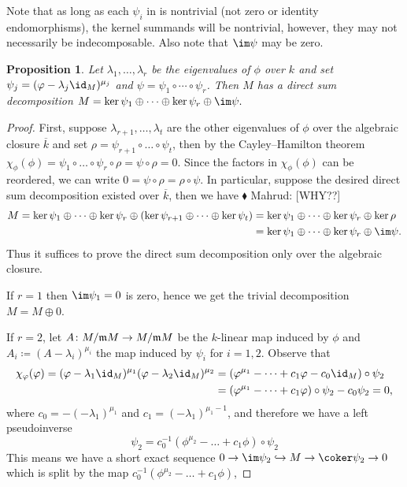 \documentclass[12pt]{article}
\let\bar\overline
\theoremstyle{theorem}
\numberwithin{thm}{section}
\newtheorem{prop}[thm]{Proposition}
\theoremstyle{definition}
\newcommand{\mahrud}[1]{{\color{ForestGreen} \sf $\blacklozenge$ Mahrud: [#1]}}
\begin{document}
Note that as long as each $\psi_i$ in  is nontrivial (not zero or identity endomorphisms), the kernel summands will be nontrivial, however, they may not necessarily be indecomposable. Also note that $\im\psi$ may be zero.

\pagebreak
\begin{prop}\label{prop:split-surj}
  Let $\lambda_1,\dots,\lambda_r$ be the eigenvalues of $\phi$ over $k$ and set $\psi_j = (\phi - \lambda_j\id_M)^{\mu_j}$ and $\psi = \psi_1\circ\cdots\circ\psi_r$. Then $M$ has a direct sum decomposition
  \( M = \ker\psi_1 \oplus \cdots \oplus \ker\psi_r \oplus \im\psi. \)
\end{prop}
\begin{proof}
  First, suppose $\lambda_{r+1},\dots,\lambda_t$ are the other eigenvalues of $\phi$ over the algebraic closure $\bar k$ and set $\rho = \psi_{r+1}\circ\dots\circ\psi_t$, then by the Cayley--Hamilton theorem $\chi_\phi(\phi) = \psi_1\circ\dots\circ\psi_r\circ\rho = \psi\circ\rho = 0$. Since the factors in $\chi_\phi(\phi)$ can be reordered, we can write $0 = \psi\circ\rho = \rho \circ \psi$. In particular, suppose the desired direct sum decomposition existed over $\bar k$, then we have \mahrud{WHY??}
  \begin{align*}
    M = \ker\psi_1\oplus\dots\oplus\ker\psi_r\oplus(\ker\psi_{r+1}\oplus\dots\oplus\ker\psi_t)
    &= \ker\psi_1\oplus\dots\oplus\ker\psi_r\oplus\ker\rho \\
    &= \ker\psi_1\oplus\dots\oplus\ker\psi_r\oplus\im\psi.
  \end{align*}
  Thus it suffices to prove the direct sum decomposition only over the algebraic closure.
  
  If $r = 1$ then $\im\psi_1=0$ is zero, hence we get the trivial decomposition $M = M \oplus 0$.

  If $r = 2$, let $A\colon M/\mathfrak m M\to M/\mathfrak m M$ be the $k$-linear map induced by $\phi$ and $A_i\coloneqq(A - \lambda_i)^{\mu_i}$ the map induced by $\psi_i$ for $i=1,2$. Observe that
  \begin{align*}
  \chi_\phi(\phi) = (\phi - \lambda_1\id_M)^{\mu_1} (\phi - \lambda_2\id_M)^{\mu_2}
  &= \left(\phi^{\mu_1} - \dots + c_1\phi - c_0\id_M\right)\circ\psi_2 \\
  &= \left(\phi^{\mu_1} - \dots + c_1\phi\right)\circ\psi_2 - c_0\psi_2 = 0,
  \end{align*}
  where $c_0 = -(-\lambda_1)^{\mu_1}$ and $c_1 = (-\lambda_1)^{\mu_1-1}$, and therefore we have a left pseudoinverse
  \[
  \psi_2
  = c_0^{-1} \left(\phi^{\mu_2} - \dots + c_1\phi \right) \circ\psi_2
  \]
  This means we have a short exact sequence $0 \to \im\psi_2 \hookrightarrow M \to \coker\psi_2 \to 0$ which is split by the map $c_0^{-1} \left(\phi^{\mu_2} - \dots + c_1\phi \right)$, %


\end{proof}
\end{document}
